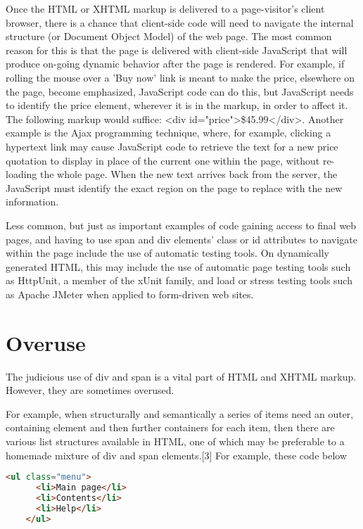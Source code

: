 Once the HTML or XHTML markup is delivered to a page-visitor's client browser, there is a chance that client-side code will need to navigate the internal structure (or Document Object Model) of the web page. The most common reason for this is that the page is delivered with client-side JavaScript that will produce on-going dynamic behavior after the page is rendered. For example, if rolling the mouse over a 'Buy now' link is meant to make the price, elsewhere on the page, become emphasized, JavaScript code can do this, but JavaScript needs to identify the price element, wherever it is in the markup, in order to affect it. The following markup would suffice: <div id="price">\$45.99</div>. Another example is the Ajax programming technique, where, for example, clicking a hypertext link may cause JavaScript code to retrieve the text for a new price quotation to display in place of the current one within the page, without re-loading the whole page. When the new text arrives back from the server, the JavaScript must identify the exact region on the page to replace with the new information.

Less common, but just as important examples of code gaining access to final web pages, and having to use span and div elements' class or id attributes to navigate within the page include the use of automatic testing tools. On dynamically generated HTML, this may include the use of automatic page testing tools such as HttpUnit, a member of the xUnit family, and load or stress testing tools such as Apache JMeter when applied to form-driven web sites.


\section{Overuse}

The judicious use of div and span is a vital part of HTML and XHTML markup. However, they are sometimes overused.

For example, when structurally and semantically a series of items need an outer, containing element and then further containers for each item, then there are various list structures available in HTML, one of which may be preferable to a homemade mixture of div and span elements.[3]
For example, these code below

\begin{lstlisting}[language=HTML]
	<ul class="menu">
	  <li>Main page</li>
	  <li>Contents</li>
	  <li>Help</li>
	</ul>
\end{lstlisting}

